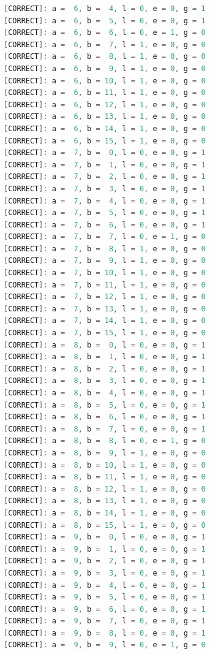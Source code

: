 \documentclass[12pt,onecolumn]{article}
\begin{document}
\begin{lstlisting}[style=verilog, language=Verilog]
[CORRECT]: a =  6, b =  4, l = 0, e = 0, g = 1
[CORRECT]: a =  6, b =  5, l = 0, e = 0, g = 1
[CORRECT]: a =  6, b =  6, l = 0, e = 1, g = 0
[CORRECT]: a =  6, b =  7, l = 1, e = 0, g = 0
[CORRECT]: a =  6, b =  8, l = 1, e = 0, g = 0
[CORRECT]: a =  6, b =  9, l = 1, e = 0, g = 0
[CORRECT]: a =  6, b = 10, l = 1, e = 0, g = 0
[CORRECT]: a =  6, b = 11, l = 1, e = 0, g = 0
[CORRECT]: a =  6, b = 12, l = 1, e = 0, g = 0
[CORRECT]: a =  6, b = 13, l = 1, e = 0, g = 0
[CORRECT]: a =  6, b = 14, l = 1, e = 0, g = 0
[CORRECT]: a =  6, b = 15, l = 1, e = 0, g = 0
[CORRECT]: a =  7, b =  0, l = 0, e = 0, g = 1
[CORRECT]: a =  7, b =  1, l = 0, e = 0, g = 1
[CORRECT]: a =  7, b =  2, l = 0, e = 0, g = 1
[CORRECT]: a =  7, b =  3, l = 0, e = 0, g = 1
[CORRECT]: a =  7, b =  4, l = 0, e = 0, g = 1
[CORRECT]: a =  7, b =  5, l = 0, e = 0, g = 1
[CORRECT]: a =  7, b =  6, l = 0, e = 0, g = 1
[CORRECT]: a =  7, b =  7, l = 0, e = 1, g = 0
[CORRECT]: a =  7, b =  8, l = 1, e = 0, g = 0
[CORRECT]: a =  7, b =  9, l = 1, e = 0, g = 0
[CORRECT]: a =  7, b = 10, l = 1, e = 0, g = 0
[CORRECT]: a =  7, b = 11, l = 1, e = 0, g = 0
[CORRECT]: a =  7, b = 12, l = 1, e = 0, g = 0
[CORRECT]: a =  7, b = 13, l = 1, e = 0, g = 0
[CORRECT]: a =  7, b = 14, l = 1, e = 0, g = 0
[CORRECT]: a =  7, b = 15, l = 1, e = 0, g = 0
[CORRECT]: a =  8, b =  0, l = 0, e = 0, g = 1
[CORRECT]: a =  8, b =  1, l = 0, e = 0, g = 1
[CORRECT]: a =  8, b =  2, l = 0, e = 0, g = 1
[CORRECT]: a =  8, b =  3, l = 0, e = 0, g = 1
[CORRECT]: a =  8, b =  4, l = 0, e = 0, g = 1
[CORRECT]: a =  8, b =  5, l = 0, e = 0, g = 1
[CORRECT]: a =  8, b =  6, l = 0, e = 0, g = 1
[CORRECT]: a =  8, b =  7, l = 0, e = 0, g = 1
[CORRECT]: a =  8, b =  8, l = 0, e = 1, g = 0
[CORRECT]: a =  8, b =  9, l = 1, e = 0, g = 0
[CORRECT]: a =  8, b = 10, l = 1, e = 0, g = 0
[CORRECT]: a =  8, b = 11, l = 1, e = 0, g = 0
[CORRECT]: a =  8, b = 12, l = 1, e = 0, g = 0
[CORRECT]: a =  8, b = 13, l = 1, e = 0, g = 0
[CORRECT]: a =  8, b = 14, l = 1, e = 0, g = 0
[CORRECT]: a =  8, b = 15, l = 1, e = 0, g = 0
[CORRECT]: a =  9, b =  0, l = 0, e = 0, g = 1
[CORRECT]: a =  9, b =  1, l = 0, e = 0, g = 1
[CORRECT]: a =  9, b =  2, l = 0, e = 0, g = 1
[CORRECT]: a =  9, b =  3, l = 0, e = 0, g = 1
[CORRECT]: a =  9, b =  4, l = 0, e = 0, g = 1
[CORRECT]: a =  9, b =  5, l = 0, e = 0, g = 1
[CORRECT]: a =  9, b =  6, l = 0, e = 0, g = 1
[CORRECT]: a =  9, b =  7, l = 0, e = 0, g = 1
[CORRECT]: a =  9, b =  8, l = 0, e = 0, g = 1
[CORRECT]: a =  9, b =  9, l = 0, e = 1, g = 0

\end{lstlisting}
\end{document}
